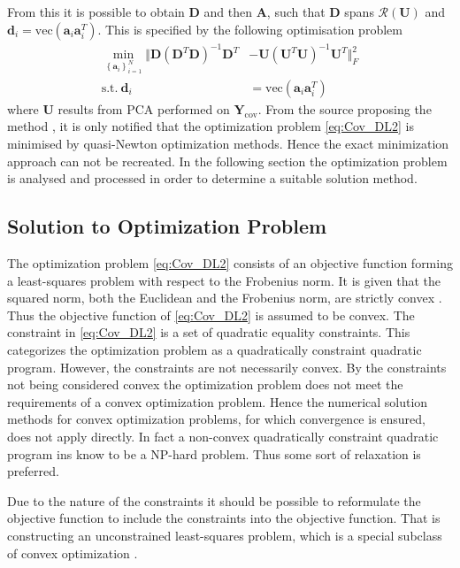 From this it is possible to obtain $\mathbf{D}$ and then $\mathbf{A}$, such that $\mathbf{D}$ spans $\mathcal{R}(\mathbf{U})$ and $\mathbf{d}_i = \text{vec}(\mathbf{a}_i \mathbf{a}_i^T)$. 
This is specified by the following optimisation problem \cite{Balkan2015}
\begin{align}
\min_{\left\{\mathbf{a}_i\right\}_{i = 1}^{N}}\Vert  \mathbf{D}(\mathbf{D}^T \mathbf{D})^{-1} \mathbf{D}^T &- \mathbf{U}(\mathbf{U}^T \mathbf{U})^{-1}\mathbf{U}^T \Vert_{F}^{2} \nonumber \\
\text{s.t.} \ \mathbf{d}_i &= \text{vec}(\mathbf{a}_i \mathbf{a}_i^T)\label{eq:Cov_DL2}
\end{align}      
where $\mathbf{U}$ results from PCA performed on $\textbf{Y}_{\text{cov}}$.
From the source proposing the method \cite{Balkan2015}, it is only notified that the optimization problem \eqref{eq:Cov_DL2} is minimised by quasi-Newton optimization methods. Hence the exact minimization approach can not be recreated.    
In the following section the optimization problem is analysed and processed in order to determine a suitable solution method. 
 
\subsection{Solution to Optimization Problem}
The optimization problem \eqref{eq:Cov_DL2} consists of an objective function forming a least-squares problem with respect to the Frobenius norm. It is given that the squared norm, both the Euclidean and the Frobenius norm, are strictly convex \cite[p.173]{norm_optimization}.
Thus the objective function of \eqref{eq:Cov_DL2} is assumed to be convex.
The constraint in \eqref{eq:Cov_DL2} is a set of quadratic equality constraints. 
This categorizes the optimization problem as a quadratically constraint quadratic program. 
However, the constraints are not necessarily convex.  
By the constraints not being considered convex the optimization problem does not meet the requirements of a convex optimization problem. Hence the numerical solution methods for convex optimization problems, for which convergence is ensured, does not apply directly. In fact a non-convex quadratically constraint quadratic program ins know to be a NP-hard problem\cite{qcqp}. Thus some sort of relaxation is preferred.  

Due to the nature of the constraints it should be possible to reformulate the objective function to include the constraints into the objective function. That is constructing an unconstrained least-squares problem, which is a special subclass of convex optimization \cite{cvxbook}.

